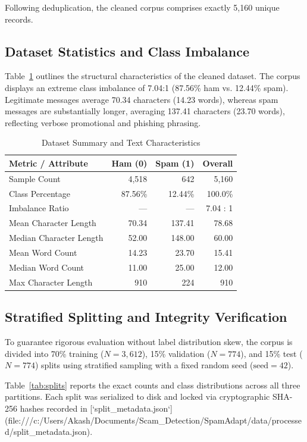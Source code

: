 \documentclass[conference]{IEEEtran}
\begin{document}
Following deduplication, the cleaned corpus comprises exactly 5,160 unique records.

\subsection{Dataset Statistics and Class Imbalance}
Table~\ref{tab:dataset_stats} outlines the structural characteristics of the cleaned dataset. The corpus displays an extreme class imbalance of 7.04:1 (87.56\% ham vs. 12.44\% spam). Legitimate messages average 70.34 characters (14.23 words), whereas spam messages are substantially longer, averaging 137.41 characters (23.70 words), reflecting verbose promotional and phishing phrasing.

\begin{table}[htbp]
\caption{Dataset Summary and Text Characteristics}
\label{tab:dataset_stats}
\centering
\begin{tabular}{lrrr}
\toprule
\textbf{Metric / Attribute} & \textbf{Ham (0)} & \textbf{Spam (1)} & \textbf{Overall} \\
\midrule
Sample Count & 4,518 & 642 & 5,160 \\
Class Percentage & 87.56\% & 12.44\% & 100.0\% \\
Imbalance Ratio & --- & --- & 7.04 : 1 \\
Mean Character Length & 70.34 & 137.41 & 78.68 \\
Median Character Length & 52.00 & 148.00 & 60.00 \\
Mean Word Count & 14.23 & 23.70 & 15.41 \\
Median Word Count & 11.00 & 25.00 & 12.00 \\
Max Character Length & 910 & 224 & 910 \\
\bottomrule
\end{tabular}
\end{table}

\subsection{Stratified Splitting and Integrity Verification}
To guarantee rigorous evaluation without label distribution skew, the corpus is divided into 70\% training ($N=3,612$), 15\% validation ($N=774$), and 15\% test ($N=774$) splits using stratified sampling with a fixed random seed ($\text{seed}=42$).

Table~\ref{tab:splits} reports the exact counts and class distributions across all three partitions. Each split was serialized to disk and locked via cryptographic SHA-256 hashes recorded in [`split_metadata.json`](file:///c:/Users/Akash/Documents/Scam_Detection/SpamAdapt/data/processed/split_metadata.json).
\end{document}
